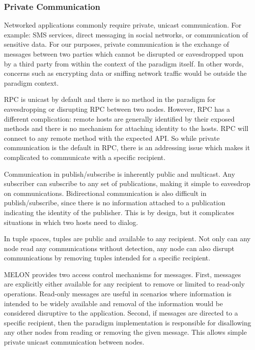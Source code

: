 \documentclass[lnicst]{svmultln}
\begin{document}
\subsubsection{Private Communication}

Networked applications commonly require private, unicast communication. For example: SMS services, direct messaging in social networks, or communication of sensitive data. For our purposes, private communication is the exchange of messages between two parties which cannot be disrupted or eavesdropped upon by a third party from within the context of the paradigm itself. In other words, concerns such as encrypting data or sniffing network traffic would be outside the paradigm context.

RPC is unicast by default and there is no method in the paradigm for eavesdropping or disrupting RPC between two nodes. However, RPC has a different complication: remote hosts are generally identified by their exposed methods and there is no mechanism for attaching identity to the hosts. RPC will connect to any remote method with the expected API. So while private communication is the default in RPC, there is an addressing issue which makes it complicated to communicate with a specific recipient.

Communication in publish/subscribe is inherently public and multicast. Any subscriber can subscribe to any set of publications, making it simple to eavesdrop on communications. Bidirectional communication is also difficult in publish/subscribe, since there is no information attached to a publication indicating the identity of the publisher. This is by design, but it complicates situations in which two hosts need to dialog.

In tuple spaces, tuples are public and available to any recipient. Not only can any node read any communications without detection, any node can also disrupt communications by removing tuples intended for a specific recipient.

MELON provides two access control mechanisms for messages. First, messages are explicitly either available for any recipient to remove or limited to read-only operations. Read-only messages are useful in scenarios where information is intended to be widely available and removal of the information would be considered disruptive to the application. Second, if messages are directed to a specific recipient, then the paradigm implementation is responsible for disallowing any other nodes from reading or removing the given message. This allows simple private unicast communication between nodes.
\end{document}

